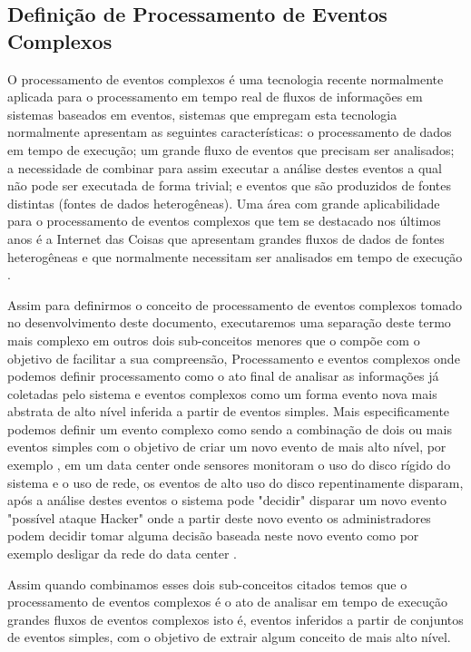 \documentclass[tid,table]{texufpel} %
\begin{document}
\subsection{Definição de Processamento de Eventos Complexos}
O processamento de eventos complexos é uma tecnologia recente normalmente aplicada para o processamento em tempo real de fluxos de informações em sistemas baseados em eventos, sistemas que empregam esta tecnologia normalmente apresentam as seguintes características: o processamento de dados em tempo de execução; um grande fluxo de eventos que precisam ser analisados; a necessidade de combinar para assim executar a análise destes eventos a qual não pode ser executada de forma trivial; e eventos que são produzidos de fontes distintas (fontes de dados heterogêneas). Uma área com grande aplicabilidade para o processamento de eventos complexos que tem se destacado nos últimos anos é a Internet das Coisas que apresentam grandes fluxos de dados de fontes heterogêneas e que normalmente necessitam ser analisados em tempo de execução \cite{jun2014design}. 

Assim para definirmos o conceito de processamento de eventos complexos tomado no desenvolvimento deste documento, executaremos uma separação  deste termo mais complexo em outros dois sub-conceitos menores que o compõe com o objetivo de facilitar a sua compreensão, Processamento e eventos complexos onde podemos definir processamento como o ato final de analisar as informações já coletadas pelo sistema e eventos complexos como um forma evento nova mais abstrata de alto nível inferida a partir de eventos simples. Mais especificamente podemos definir um evento complexo como sendo a combinação de dois ou mais eventos simples com o objetivo de criar um novo evento de mais alto nível, por exemplo \cite{dayarathna2018recent}, em um data center onde sensores monitoram o uso do disco rígido do sistema e o uso de rede, os eventos de alto uso do disco repentinamente disparam, após a análise destes eventos o sistema pode "decidir" disparar um novo evento "possível ataque Hacker" onde a partir deste novo evento os administradores podem decidir tomar alguma decisão  baseada neste novo evento como por exemplo desligar da rede do data center \cite{wu2006high}. 

Assim quando combinamos esses dois sub-conceitos citados temos que o processamento de eventos complexos é o ato de analisar em tempo de execução grandes fluxos de eventos complexos isto é, eventos inferidos a partir de conjuntos de eventos simples, com o objetivo de extrair algum conceito de mais alto nível.
  
\end{document}
